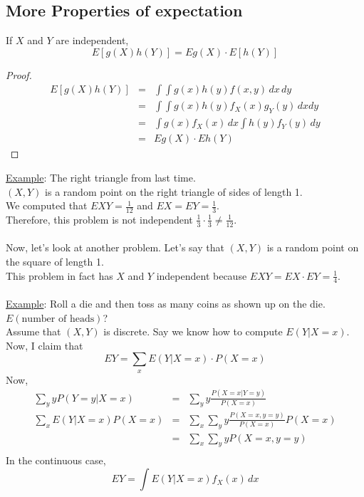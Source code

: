   \subsection*{More Properties of expectation}
    If $X$ and $Y$ are independent, 
    $$
      E[g(X)h(Y)] = Eg(X) \cdot E[h(Y)]
    $$
    \begin{proof}
      \begin{eqnarray*}
        E[g(X)h(Y)] & = &
        \int\int g(x)h(y)f(x,y)\,dx\,dy\\
        & = & \int\int g(x)h(y)f_X(x)g_Y(y)\,dxdy\\
        & = & \int g(x)f_X(x)\,dx \int h(y)f_Y(y)\,dy\\
        & = & Eg(X) \cdot Eh(Y)
      \end{eqnarray*}
    \end{proof}
  \noindent
  \underline{Example}: The right triangle from last time.\\
  $(X,Y)$ is a random point on the right triangle of sides of length 1.\\
  We computed that $EXY = \frac{1}{12}$ and $EX = EY = \frac{1}{3}$.\\
  Therefore, this problem is not independent $\frac{1}{3} \cdot \frac{1}{3} 
  \not= \frac{1}{12}$.\\\\
  Now, let's look at another problem. Let's say that $(X,Y)$ is a random point
  on the square of length 1.\\
  This problem in fact has $X$ and $Y$ independent because $EXY = EX \cdot 
  EY = \frac{1}{4}$.\\\\
  \underline{Example}: Roll a die and then toss as many coins as shown up
    on the die.\\
    $E(\text{number of heads})$?\\
    Assume that $(X,Y)$ is discrete. Say we know how to compute $E(Y|
    X = x)$. Now, I claim that 
    $$
      EY = \sum_x E(Y | X = x) \cdot P(X = x)
    $$
    Now, 
    \begin{eqnarray*}
      \sum_y yP(Y = y | X = x) & = & \sum_y y\frac{P(X = x | Y = y)}{P(X = x)}\\
      \sum_x E(Y|X = x) P(X = x) & = & \sum_x \sum_y y\frac{P(X = x, y = y)}
      {P(X = x)} P(X=x)\\
      & = & \sum_x \sum_y yP(X = x, y = y)\\
    \end{eqnarray*}
    In the continuous case,
    $$
      EY = \int E(Y | X = x) f_X(x) \,dx 
    $$
